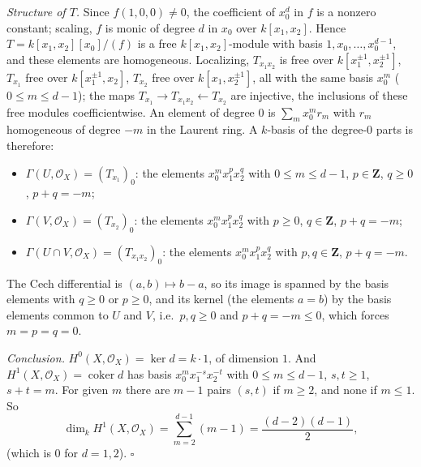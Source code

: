 \documentclass[11pt]{article}
\begin{document}
\emph{Structure of $T$.} Since $f(1,0,0)\ne0$, the coefficient of $x_0^d$ in $f$ is a nonzero constant; scaling, $f$ is monic of degree $d$ in $x_0$ over $k[x_1,x_2]$. Hence $T=k[x_1,x_2][x_0]/(f)$ is a free $k[x_1,x_2]$-module with basis $1,x_0,\dots,x_0^{d-1}$, and these elements are homogeneous. Localizing, $T_{x_1x_2}$ is free over $k[x_1^{\pm1},x_2^{\pm1}]$, $T_{x_1}$ free over $k[x_1^{\pm1},x_2]$, $T_{x_2}$ free over $k[x_1,x_2^{\pm1}]$, all with the same basis $x_0^m$ ($0\le m\le d-1$); the maps $T_{x_1}\to T_{x_1x_2}\leftarrow T_{x_2}$ are injective, the inclusions of these free modules coefficientwise. An element of degree $0$ is $\sum_mx_0^mr_m$ with $r_m$ homogeneous of degree $-m$ in the Laurent ring. A $k$-basis of the degree-$0$ parts is therefore:
\begin{itemize}
\item $\Gamma(U,\mathcal O_X)=(T_{x_1})_0$: the elements $x_0^mx_1^px_2^q$ with $0\le m\le d-1$, $p\in\mathbf Z$, $q\ge0$, $p+q=-m$;
\item $\Gamma(V,\mathcal O_X)=(T_{x_2})_0$: the elements $x_0^mx_1^px_2^q$ with $p\ge0$, $q\in\mathbf Z$, $p+q=-m$;
\item $\Gamma(U\cap V,\mathcal O_X)=(T_{x_1x_2})_0$: the elements $x_0^mx_1^px_2^q$ with $p,q\in\mathbf Z$, $p+q=-m$.
\end{itemize}
The Cech differential is $(a,b)\mapsto b-a$, so its image is spanned by the basis elements with $q\ge0$ or $p\ge0$, and its kernel (the elements $a=b$) by the basis elements common to $U$ and $V$, i.e.\ $p,q\ge0$ and $p+q=-m\le0$, which forces $m=p=q=0$.

\emph{Conclusion.} $H^0(X,\mathcal O_X)=\ker d=k\cdot1$, of dimension $1$. And $H^1(X,\mathcal O_X)=\operatorname{coker}d$ has basis $x_0^mx_1^{-s}x_2^{-t}$ with $0\le m\le d-1$, $s,t\ge1$, $s+t=m$. For given $m$ there are $m-1$ pairs $(s,t)$ if $m\ge2$, and none if $m\le1$. So
\[
\dim_kH^1(X,\mathcal O_X)=\sum_{m=2}^{d-1}(m-1)=\frac{(d-2)(d-1)}2,
\]
(which is $0$ for $d=1,2$). \hfill$\square$
\end{document}
